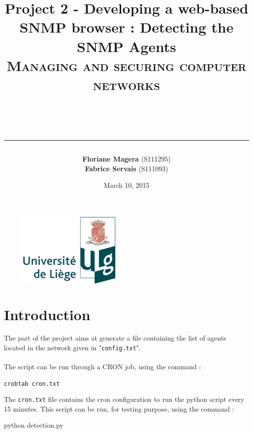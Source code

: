 \documentclass[a4paper,titlepage]{article}
\begin{document}
\begin{titlepage}

\begin{figure}
\centering
\includegraphics[width=5cm]{logo-ulg.png}
\end{figure}



\title{
\vspace{0.2cm}
\LARGE{\textbf{Project 2 - Developing a web-based SNMP browser : Detecting the SNMP Agents}} \\ \textsc{Managing and securing computer networks}
\author{\textbf{Floriane Magera} \small{(S111295})\\\textbf{Fabrice Servais} \small{(S111093})}\\
\date{March 10, 2015}
\rule{15cm}{1.5pt}
}

\end{titlepage}

\pagestyle{fancy}

\maketitle


\section{Introduction}

The part of the project aims at generate a file containing the list of agents located in the network given in "\texttt{config.txt}".
\paragraph{}
The script can be run through a CRON job, using the command :
\begin{center}
	\texttt{crobtab cron.txt}
\end{center}
The \texttt{cron.txt} file contains the cron configuration to run the python script every 15 minutes. This script can be run, for testing purpose, using the command : 
\begin{center}
	python detection.py
\end{center}
\end{document}
